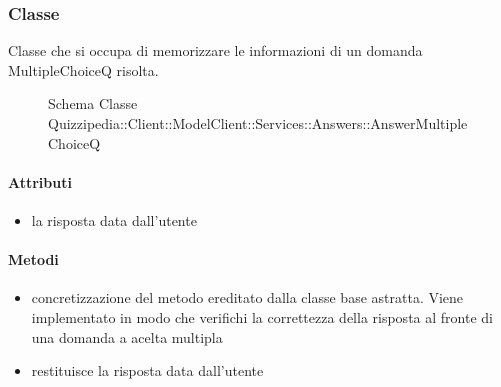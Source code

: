 \subsubsection{Classe }
Classe che si occupa di memorizzare le informazioni di un domanda MultipleChoiceQ risolta.
\begin{figure}[H]
\centering
\noindent{}
\caption[Schema Classe AnswerMultipleChoiceQ]{Schema Classe Quizzipedia::Client::ModelClient::Services::Answers::AnswerMultipleChoiceQ}
\end{figure}
\paragraph{Attributi}
\begin{itemize}
\item {}
\newline
la risposta data dall'utente
\end{itemize}
\paragraph{Metodi}
\begin{itemize}
\item {}
\newline
concretizzazione del metodo ereditato dalla classe base astratta. Viene implementato in modo che verifichi la correttezza della risposta al fronte di una domanda a acelta multipla
\newline
\item {}
\newline
restituisce la risposta data dall'utente
\newline
\end{itemize}
